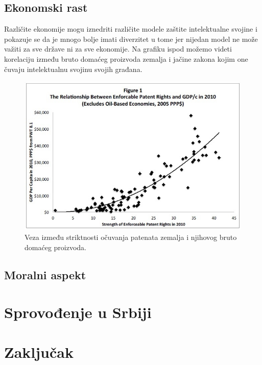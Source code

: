 \documentclass[a4paper]{article}
\begin{document}
\label{subsec:fin}

\subsection{Ekonomski rast}
\label{subsec:ekon}

Različite ekonomije mogu iznedriti različite modele zaštite intelektualne
svojine i pokazuje se da je mnogo bolje imati diverzitet u tome jer nijedan
model ne može važiti za sve države ni za sve ekonomije. Na grafiku ispod možemo videti korelaciju između bruto domaćeg proizvoda zemalja i jačine zakona kojim one čuvaju intelektualnu svojinu svojih građana.

\begin{figure}[h!]
\begin{center}
\includegraphics[scale=0.75]{patents_and_gdp.jpg}
\end{center}
\caption{Veza između striktnosti očuvanja patenata zemalja i njihovog bruto domaćeg proizvoda.}
\label{fig:pat_gdp}
\end{figure}

\subsection{Moralni aspekt}
\label{subsec:morala_sam}

\section{Sprovođenje u Srbiji}
\label{sec:srb}

\section{Zaključak}
\label{sec:zakljucak}
\end{document}
